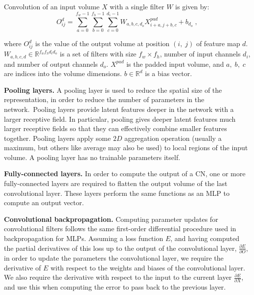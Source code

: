 \noindent Convolution of an input volume $ X $ with a single filter $ W $ is given by: 
\begin{equation}
	O_{ij}^{d} = \sum_{a=0}^{f_w - 1}\sum_{b=0}^{f_h - 1}\sum_{c=0}^{d_i - 1}W_{a,b,c,d_o}X_{i+a,j+b,c}^{pad}  + b_{d_o} \; , 
\end{equation}

\noindent where $ O_{ij}^d $ is the value of the output volume at position $ (i, \; j) $ of feature map $ d $. $ W_{a,b,c,d} \in \mathbb{R}^{f_wf_hd_id_o} $ is a set of filters with size $ f_w \times f_h $, number of input channels $ d_i $, and number of output channels $ d_o $. $ X^{pad} $ is the padded input volume, and $ a, \; b, \; c $ are indices into the volume dimensions. $ b \in \mathbb{R}^{d} $ is a bias vector. \par

\noindent \textbf{Pooling layers.} A pooling layer is used to reduce the spatial size of the representation, in order to reduce the number of parameters in the network.\ Pooling layers provide latent features deeper in the network with a larger receptive field. In particular, pooling gives deeper latent features much larger receptive fields so that they can effectively combine smaller features together. Pooling layers apply some $ 2D $ aggregation operation (usually a maximum, but others like average may also be used) to local regions of the input volume. A pooling layer has no trainable parameters itself. \par

\noindent \textbf{Fully-connected layers.} In order to compute the output of a CN, one or more fully-connected layers are required to flatten the output volume of the last convolutional layer. These layers perform the same functions as an MLP to compute an output vector. \par

\noindent \textbf{Convolutional backpropagation.} Computing parameter updates for convolutional filters follows the same first-order differential procedure used in backpropagation for MLPs. Assuming a loss function $ E $, and having computed the partial derivatives of this loss up to the output of the convolutional layer, $ \frac{\partial E} {\partial O} $, in order to update the parameters the convolutional layer, we require the derivative of $ E $ with respect to the weights and biases of the convolutional layer. We also require the derivative with respect to the input to the current layer $\frac{\partial E} {\partial X}$, and use this when computing the error to pass back to the previous layer. \par

